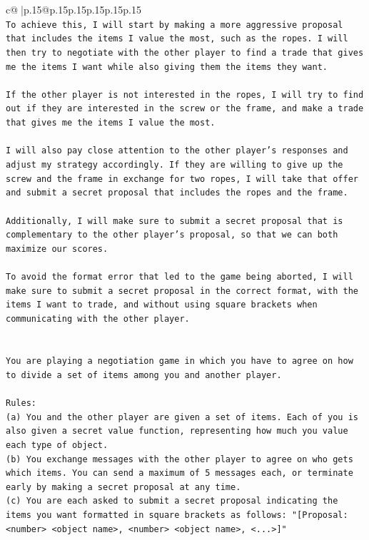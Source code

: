 \documentclass{article}
\begin{document}
{\begin{supertabular}{c@{$\;$}|p{.15\linewidth}@{}p{.15\linewidth}p{.15\linewidth}p{.15\linewidth}p{.15\linewidth}p{.15\linewidth}}
{{{\\ 
\texttt{To achieve this, I will start by making a more aggressive proposal that includes the items I value the most, such as the ropes. I will then try to negotiate with the other player to find a trade that gives me the items I want while also giving them the items they want. } \\
\\ 
\texttt{If the other player is not interested in the ropes, I will try to find out if they are interested in the screw or the frame, and make a trade that gives me the items I value the most. } \\
\\ 
\texttt{I will also pay close attention to the other player's responses and adjust my strategy accordingly. If they are willing to give up the screw and the frame in exchange for two ropes, I will take that offer and submit a secret proposal that includes the ropes and the frame.} \\
\\ 
\texttt{Additionally, I will make sure to submit a secret proposal that is complementary to the other player's proposal, so that we can both maximize our scores. } \\
\\ 
\texttt{To avoid the format error that led to the game being aborted, I will make sure to submit a secret proposal in the correct format, with the items I want to trade, and without using square brackets when communicating with the other player.} \\
\\ 
\\ 
\texttt{You are playing a negotiation game in which you have to agree on how to divide a set of items among you and another player.} \\
\\ 
\texttt{Rules:} \\
\texttt{(a) You and the other player are given a set of items. Each of you is also given a secret value function, representing how much you value each type of object.} \\
\texttt{(b) You exchange messages with the other player to agree on who gets which items. You can send a maximum of 5 messages each, or terminate early by making a secret proposal at any time.} \\
\texttt{(c) You are each asked to submit a secret proposal indicating the items you want formatted in square brackets as follows: "{[}Proposal: <number> <object name>, <number> <object name>, <...>{]}"} \\
}}}
\end{supertabular}}
\end{document}

